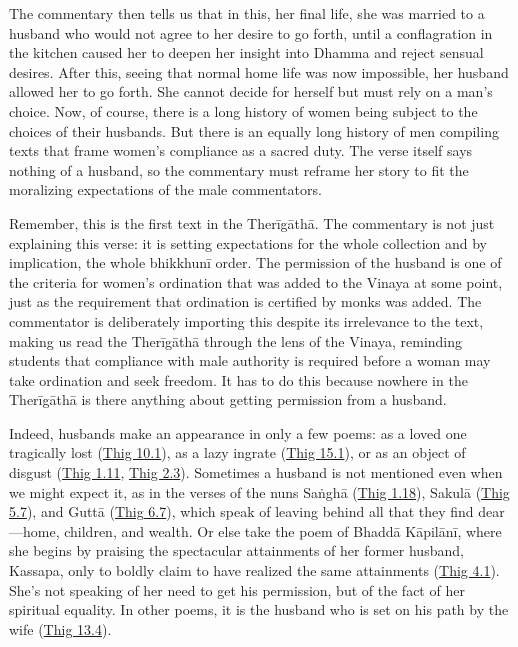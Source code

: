 \documentclass[12pt,openany]{book}%
\begin{document}
The commentary then tells us that in this, her final life, she was married to a husband who would not agree to her desire to go forth, until a conflagration in the kitchen caused her to deepen her insight into Dhamma and reject sensual desires. After this, seeing that normal home life was now impossible, her husband allowed her to go forth. She cannot decide for herself but must rely on a man’s choice. Now, of course, there is a long history of women being subject to the choices of their husbands. But there is an equally long history of men compiling texts that frame women’s compliance as a sacred duty. The verse itself says nothing of a husband, so the commentary must reframe her story to fit the moralizing expectations of the male commentators.

Remember, this is the first text in the \textsanskrit{Therīgāthā}. The commentary is not just explaining this verse: it is setting expectations for the whole collection and by implication, the whole \textsanskrit{bhikkhunī} order. The permission of the husband is one of the criteria for women’s ordination that was added to the Vinaya at some point, just as the requirement that ordination is certified by monks was added. The commentator is deliberately importing this despite its irrelevance to the text, making us read the \textsanskrit{Therīgāthā} through the lens of the Vinaya, reminding students that compliance with male authority is required before a woman may take ordination and seek freedom. It has to do this because nowhere in the \textsanskrit{Therīgāthā} is there anything about getting permission from a husband.

Indeed, husbands make an appearance in only a few poems: as a loved one tragically lost (\href{https://suttacentral.net/thig10.1}{Thig 10.1}), as a lazy ingrate (\href{https://suttacentral.net/thig15.1}{Thig 15.1}), or as an object of disgust (\href{https://suttacentral.net/thig1.11}{Thig 1.11}, \href{https://suttacentral.net/thig2.3}{Thig 2.3}). Sometimes a husband is not mentioned even when we might expect it, as in the verses of the nuns \textsanskrit{Saṅghā} (\href{https://suttacentral.net/thig1.18}{Thig 1.18}), \textsanskrit{Sakulā} (\href{https://suttacentral.net/thig5.7}{Thig 5.7}), and \textsanskrit{Guttā} (\href{https://suttacentral.net/thig6.7}{Thig 6.7}), which speak of leaving behind all that they find dear—home, children, and wealth. Or else take the poem of \textsanskrit{Bhaddā} \textsanskrit{Kāpilānī}, where she begins by praising the spectacular attainments of her former husband, Kassapa, only to boldly claim to have realized the same attainments (\href{https://suttacentral.net/thig4.1}{Thig 4.1}). She’s not speaking of her need to get his permission, but of the fact of her spiritual equality. In other poems, it is the husband who is set on his path by the wife (\href{https://suttacentral.net/thig13.4}{Thig 13.4}).
\end{document}
